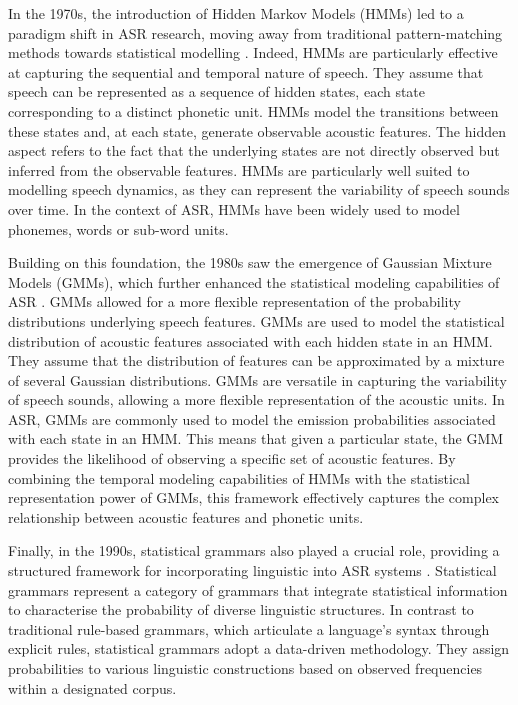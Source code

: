 In the 1970s, the introduction of Hidden Markov Models (HMMs) led to a paradigm shift in ASR research, moving away from traditional pattern-matching methods towards statistical modelling \cite{first_asr}. Indeed, HMMs are particularly effective at capturing the sequential and temporal nature of speech. They assume that speech can be represented as a sequence of hidden states, each state corresponding to a distinct phonetic unit. HMMs model the transitions between these states and, at each state, generate observable acoustic features. The hidden aspect refers to the fact that the underlying states are not directly observed but inferred from the observable features. HMMs are particularly well suited to modelling speech dynamics, as they can represent the variability of speech sounds over time. In the context of ASR, HMMs have been widely used to model phonemes, words or sub-word units.

Building on this foundation, the 1980s saw the emergence of Gaussian Mixture Models (GMMs), which further enhanced the statistical modeling capabilities of ASR \cite{htk_book}. GMMs allowed for a more flexible representation of the probability distributions underlying speech features.
GMMs are used to model the statistical distribution of acoustic features associated with each hidden state in an HMM. They assume that the distribution of features can be approximated by a mixture of several Gaussian distributions. GMMs are versatile in capturing the variability of speech sounds, allowing a more flexible representation of the acoustic units. In ASR, GMMs are commonly used to model the emission probabilities associated with each state in an HMM. This means that given a particular state, the GMM provides the likelihood of observing a specific set of acoustic features. By combining the temporal modeling capabilities of HMMs with the statistical representation power of GMMs, this framework effectively captures the complex relationship between acoustic features and phonetic units.

Finally, in the 1990s, statistical grammars also played a crucial role, providing a structured framework for incorporating linguistic into ASR systems \cite{darpa1992}. Statistical grammars represent a category of grammars that integrate statistical information to characterise the probability of diverse linguistic structures. In contrast to traditional rule-based grammars, which articulate a language's syntax through explicit rules, statistical grammars adopt a data-driven methodology. They assign probabilities to various linguistic constructions based on observed frequencies within a designated corpus.


